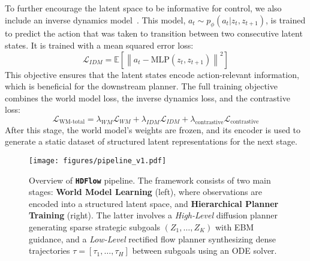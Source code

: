 \documentclass{article} %
\begin{document}
To further encourage the latent space to be informative for control, we also include an inverse dynamics model~\citep{agrawal2016learning,pathak2018zero}. This model, $a_t \sim p_\phi(a_t | z_t, z_{t+1})$, is trained to predict the action that was taken to transition between two consecutive latent states. It is trained with a mean squared error loss:
\begin{equation}
    \mathcal{L}_{IDM} = \mathbb{E} \left[ \left\| a_t - \text{MLP}(z_t, z_{t+1}) \right\|^2 \right]
\end{equation}
This objective ensures that the latent states encode action-relevant information, which is beneficial for the downstream planner. The full training objective combines the world model loss, the inverse dynamics loss, and the contrastive loss:
\begin{equation}
\mathcal{L}_{\text{WM-total}} = \lambda_{WM} \mathcal{L}_{WM} + \lambda_{IDM} \mathcal{L}_{IDM} + \lambda_{\text{contrastive}} \mathcal{L}_{\text{contrastive}}
\end{equation}
After this stage, the world model's weights are frozen, and its encoder is used to generate a static dataset of structured latent representations for the next stage.

\begin{figure}[t]
    \centering
    \texttt{[image: figures/pipeline\_v1.pdf]}
    \caption{Overview of \texttt{\textbf{HDFlow}} pipeline. The framework consists of two main stages: \textbf{World Model Learning} (left), where observations are encoded into a structured latent space, and \textbf{Hierarchical Planner Training} (right). The latter involves a \textit{High-Level} diffusion planner generating sparse strategic subgoals $(Z_1, \dots, Z_K)$ with EBM guidance, and a \textit{Low-Level} rectified flow planner synthesizing dense trajectories $\tau=[\tau_1, \dots, \tau_H]$ between subgoals using an ODE solver.}
    \vspace{-12pt}
    \label{fig:pipeline}
\end{figure}
\end{document}
